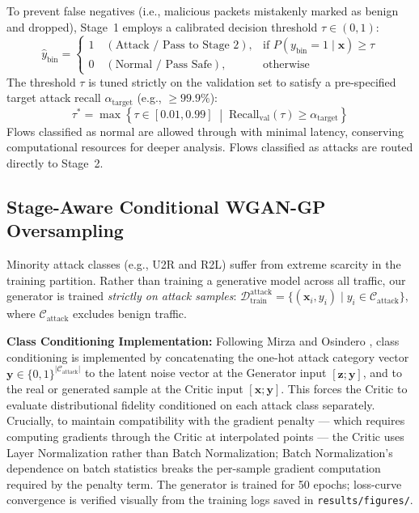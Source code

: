 \documentclass[journal]{IEEEtran}
\begin{document}
To prevent false negatives (i.e., malicious packets mistakenly marked as benign and dropped), Stage~1 employs a calibrated decision threshold $\tau \in (0, 1)$:
\begin{equation}
\hat{y}_{\text{bin}} = 
\begin{cases} 
1 \quad (\text{Attack / Pass to Stage 2}), & \text{if } P(y_{\text{bin}} = 1 \mid \mathbf{x}) \ge \tau \\ 
0 \quad (\text{Normal / Pass Safe}), & \text{otherwise}
\end{cases}
\label{eq:threshold}
\end{equation}
The threshold $\tau$ is tuned strictly on the validation set to satisfy a pre-specified target attack recall $\alpha_{\text{target}}$ (e.g., $\ge 99.9\%$):
\begin{equation}
\tau^* = \max \left\{ \tau \in [0.01, 0.99] \;\middle|\; \text{Recall}_{\text{val}}(\tau) \ge \alpha_{\text{target}} \right\}
\label{eq:tune_tau}
\end{equation}
Flows classified as normal are allowed through with minimal latency, conserving computational resources for deeper analysis. Flows classified as attacks are routed directly to Stage~2.

\subsection{Stage-Aware Conditional WGAN-GP Oversampling}
Minority attack classes (e.g., U2R and R2L) suffer from extreme scarcity in the training partition. Rather than training a generative model across all traffic, our generator is trained \textit{strictly on attack samples}: $\mathcal{D}_{\text{train}}^{\text{attack}} = \{(\mathbf{x}_i, y_i) \mid y_i \in \mathcal{C}_{\text{attack}}\}$, where $\mathcal{C}_{\text{attack}}$ excludes benign traffic.

\textbf{Class Conditioning Implementation:} Following Mirza and Osindero \cite{mirza2014conditional}, class conditioning is implemented by concatenating the one-hot attack category vector $\mathbf{y} \in \{0,1\}^{|\mathcal{C}_{\text{attack}}|}$ to the latent noise vector at the Generator input $[\mathbf{z}; \mathbf{y}]$, and to the real or generated sample at the Critic input $[\mathbf{x}; \mathbf{y}]$. This forces the Critic to evaluate distributional fidelity conditioned on each attack class separately. Crucially, to maintain compatibility with the gradient penalty --- which requires computing gradients through the Critic at interpolated points --- the Critic uses Layer Normalization \cite{ba2016layer} rather than Batch Normalization; Batch Normalization's dependence on batch statistics breaks the per-sample gradient computation required by the penalty term. The generator is trained for 50 epochs; loss-curve convergence is verified visually from the training logs saved in \texttt{results/figures/}.
\end{document}
